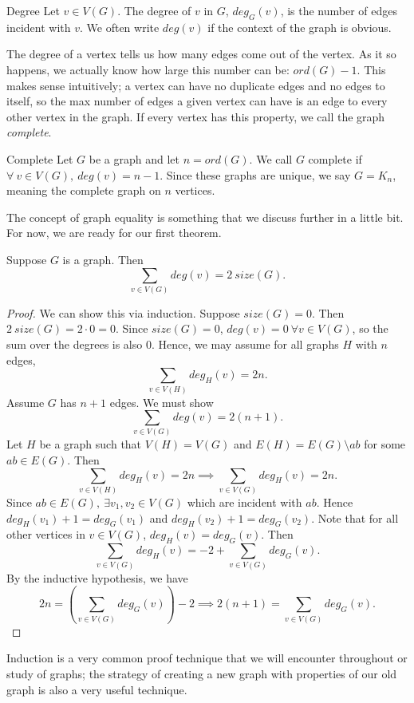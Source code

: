 \begin{definition}{Degree}
    Let $v\in V(G)$. The degree of $v$ in $G$, $deg_{G}(v)$, is the number of edges incident with $v$.
    We often write $deg(v)$ if the context of the graph is obvious.
\end{definition}

The degree of a vertex tells us how many edges come out of the vertex.
As it so happens, we actually know how large this number can be: $ord(G) - 1$.
This makes sense intuitively; a vertex can have no duplicate edges and no edges to itself, so the max number of edges a given vertex can have is an edge to every other vertex in the graph.
If every vertex has this property, we call the graph \textit{complete}.

\begin{definition}{Complete}
    Let $G$ be a graph and let $n=ord(G)$. We call $G$ complete if $\forall\ v\in V(G),\ deg(v)=n-1$. Since these graphs are unique, we say $G=K_{n}$, meaning the complete graph on $n$ vertices.
\end{definition}

The concept of graph equality is something that we discuss further in a little bit.
For now, we are ready for our first theorem.

\begin{theorem}{}
    Suppose $G$ is a graph. Then
    \[
        \sum_{v\in V(G)}deg(v) = 2\ size(G).
    \]
\end{theorem}
\begin{proof}
    We can show this via induction. Suppose $size(G)=0$. Then $2\ size(G)=2\cdot0=0$.
    Since $size(G)=0$, $deg(v)=0\ \forall v\in V(G)$, so the sum over the degrees is also 0.
    Hence, we may assume for all graphs $H$ with $n$ edges,
    \[
        \sum_{v\in V(H)}deg_{H}(v) = 2n.
    \]
    Assume $G$ has $n+1$ edges. We must show
    \[
        \sum_{v\in V(G)}deg(v)=2(n+1).
    \]
    Let $H$ be a graph such that $V(H)=V(G)$ and $E(H)=E(G)\setminus ab$ for some $ab\in E(G)$. Then
    \[
        \sum_{v\in V(H)}deg_{H}(v)=2n\implies\sum_{v\in V(G)}deg_{H}(v)=2n.
    \]
    Since $ab\in E(G),\ \exists v_{1},v_{2}\in V(G)$ which are incident with $ab$.
    Hence $deg_{H}(v_{1})+1=deg_{G}(v_{1})$ and $deg_{H}(v_{2})+1=deg_{G}(v_{2})$.
    Note that for all other vertices in $v\in V(G)$, $deg_{H}(v)=deg_{G}(v)$.
    Then
    \[
        \sum_{v\in V(G)}deg_{H}(v)=-2+\sum_{v\in V(G)}deg_{G}(v).
    \]
    By the inductive hypothesis, we have
    \[
        2n=\left( \sum_{v\in V(G)}deg_{G}(v) \right) - 2\implies
        2(n+1)=\sum_{v\in V(G)}deg_{G}(v).
    \]
\end{proof}

Induction is a very common proof technique that we will encounter throughout or study of graphs; the strategy of creating a new graph with properties of our old graph is also a very useful technique.
